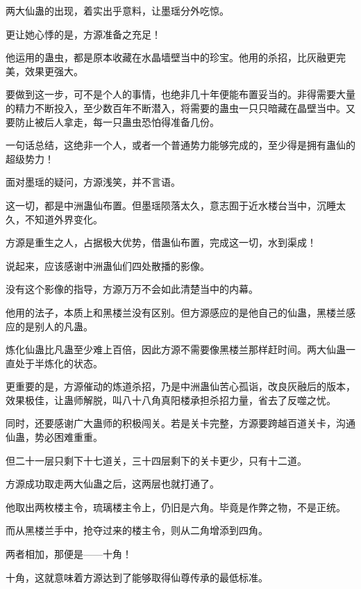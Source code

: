 
\begin{this_body}



两大仙蛊的出现，着实出乎意料，让墨瑶分外吃惊。

更让她心悸的是，方源准备之充足！

他运用的蛊虫，都是原本收藏在水晶墙壁当中的珍宝。他用的杀招，比灰融更完美，效果更强大。

要做到这一步，可不是个人的事情，也绝非几十年便能布置妥当的。非得需要大量的精力不断投入，至少数百年不断潜入，将需要的蛊虫一只只暗藏在晶壁当中。又要防止被后人拿走，每一只蛊虫恐怕得准备几份。

一句话总结，这绝非一个人，或者一个普通势力能够完成的，至少得是拥有蛊仙的超级势力！

面对墨瑶的疑问，方源浅笑，并不言语。

这一切，都是中洲蛊仙布置。但墨瑶陨落太久，意志囿于近水楼台当中，沉睡太久，不知道外界变化。

方源是重生之人，占据极大优势，借蛊仙布置，完成这一切，水到渠成！

说起来，应该感谢中洲蛊仙们四处散播的影像。

没有这个影像的指导，方源万万不会如此清楚当中的内幕。

他用的法子，本质上和黑楼兰没有区别。但方源感应的是他自己的仙蛊，黑楼兰感应的是别人的凡蛊。

炼化仙蛊比凡蛊至少难上百倍，因此方源不需要像黑楼兰那样赶时间。两大仙蛊一直处于半炼化的状态。

更重要的是，方源催动的炼道杀招，乃是中洲蛊仙苦心孤诣，改良灰融后的版本，效果极佳，让蛊师解脱，叫八十八角真阳楼承担杀招力量，省去了反噬之忧。

同时，还要感谢广大蛊师的积极闯关。若是关卡完整，方源要跨越百道关卡，沟通仙蛊，势必困难重重。

但二十一层只剩下十七道关，三十四层剩下的关卡更少，只有十二道。

方源成功取走两大仙蛊之后，这两层也就打通了。

他取出两枚楼主令，琉璃楼主令上，仍旧是六角。毕竟是作弊之物，不是正统。

而从黑楼兰手中，抢夺过来的楼主令，则从二角增添到四角。

两者相加，那便是——十角！

十角，这就意味着方源达到了能够取得仙尊传承的最低标准。


\end{this_body}
